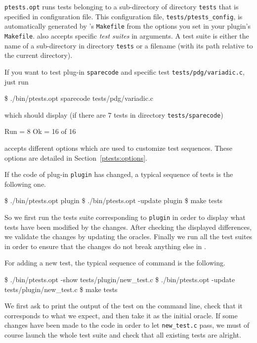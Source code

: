 \texttt{ptests.opt} runs tests belonging to a sub-directory 
of directory \texttt{tests} that is specified in
\ptests configuration file. This configuration file,
\texttt{tests/ptests\_config}, is automatically generated by \framac's
\texttt{Makefile} from the options you set in your plugin's \texttt{Makefile}.
\ptests also accepts specific \emph{test suites}
in arguments.  A test suite is either the name of a
sub-directory in directory \texttt{tests} or a filename (with its path relative
to the current directory).

\begin{example}
  If you want to test plug-in
  \texttt{sparecode}
  and specific test \texttt{tests/pdg/variadic.c}, just run
\begin{shell}
\$ ./bin/ptests.opt sparecode tests/pdg/variadic.c
\end{shell}
which should display (if there are 7 tests in directory
\texttt{tests/sparecode})
\begin{shell}
Run = 8
Ok  = 16 of 16
\end{shell}
\end{example}

\ptests accepts different options which are used to customize test
sequences. These options are detailed in Section~\ref{ptests:options}.

\begin{example}
If the code of plug-in \texttt{plugin} has changed, a typical sequence of tests
is the following one.
\begin{shell}
\$ ./bin/ptests.opt plugin
\$ ./bin/ptests.opt -update plugin
\$ make tests
\end{shell}
So we first run the tests suite corresponding to \texttt{plugin} in order to
display what tests have been modified by the changes. After checking the
displayed differences, we validate the changes by updating the
oracles. Finally we run all the test suites in
order to ensure that the changes do not break anything else in \framac.
\end{example}
\begin{example}
For adding a new test, the typical sequence of command is the following.
\begin{shell}
\$ ./bin/ptests.opt -show tests/plugin/new_test.c
\$ ./bin/ptests.opt -update tests/plugin/new_test.c
\$ make tests
\end{shell}
We first ask \ptests to print the output of the test on the command line, check
that it corresponds to what we expect, and then take it as the initial oracle.
If some changes have been made to the code in order to let \texttt{new\_test.c}
pass, we must of course launch the whole test suite and check that all
existing tests are alright.
\end{example}

